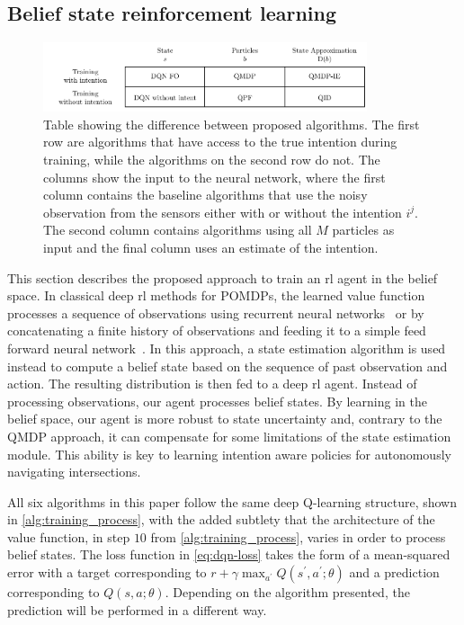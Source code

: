 \subsection{Belief state reinforcement learning}
\label{sec:belief_state_rl}
\begin{figure}[!t]
    \centering
        \hspace*{-4cm}\includegraphics[width=0.85\textwidth]{figures/figures-algorithms.pdf}
        \caption{Table showing the difference between proposed algorithms. The first row are algorithms that have access to the true intention during training, while the algorithms on the second row do not. The columns show the input to the neural network, where the first column contains the baseline algorithms that use the noisy observation from the sensors either with or without the intention $i^j$. The second column contains algorithms using all $M$ particles as input and the final column uses an estimate of the intention.}
    \label{fig:algorithms}
\end{figure}
This section describes the proposed approach to train an \gls{rl} agent in the belief space. 
In classical deep \gls{rl} methods for POMDPs, the learned value function processes a sequence of observations using recurrent neural networks~\cite{HausknechtS15drqn} or by concatenating a finite history of observations and feeding it to a simple feed forward neural network~\cite{Mnih2015}. In this approach, a state estimation algorithm is used instead to compute a belief state based on the sequence of past observation and action. The resulting distribution is then fed to a deep \gls{rl} agent. 
Instead of processing observations, our agent processes belief states. By learning in the belief space, our agent is more robust to state uncertainty and, contrary to the QMDP approach, it can compensate for some limitations of the state estimation module. 
This ability is key to learning intention aware policies for autonomously navigating intersections.

All six algorithms in this paper follow the same deep Q-learning structure, shown in \ref{alg:training_process}, with the added subtlety that the architecture of the value function, in step $10$ from \ref{alg:training_process}, varies in order to process belief states. 
The loss function in \ref{eq:dqn-loss} takes the form of a mean-squared error with a target corresponding to $r +  \gamma \max_{a^\prime}Q(s^\prime, a^\prime; \theta)$ and a prediction corresponding to $Q(s, a; \theta)$. 
Depending on the algorithm presented, the prediction will be performed in a different way.

